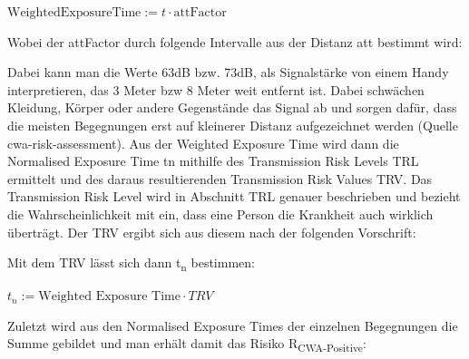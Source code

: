 \documentclass[conference]{IEEEtran}
\begin{document}
\centerline{\text{ }}
\centerline{$\text{WeightedExposureTime} := t \cdot \text{attFactor}$}
\centerline{\text{ }}

Wobei der attFactor durch folgende Intervalle aus der Distanz att bestimmt wird:

\centerline{\text{ }}




\centerline{\text{ }}

Dabei kann man die Werte 63dB bzw. 73dB, als Signalstärke von einem Handy interpretieren, das 3 Meter bzw 8 Meter weit entfernt ist. 
Dabei schwächen Kleidung, Körper oder andere Gegenstände das Signal ab und sorgen dafür, dass die meisten Begegnungen erst auf kleinerer Distanz aufgezeichnet werden (Quelle cwa-risk-assessment).
Aus der Weighted Exposure Time wird dann die Normalised Exposure Time t­n mithilfe des Transmission Risk Levels TRL ermittelt und des daraus resultierenden Transmission Risk Values TRV. 
Das Transmission Risk Level wird in Abschnitt TRL genauer beschrieben und bezieht die Wahrscheinlichkeit mit ein, dass eine Person die Krankheit auch wirklich überträgt. 
Der TRV ergibt sich aus diesem nach der folgenden Vorschrift:

\centerline{\text{ }}








\centerline{\text{ }}

Mit dem TRV lässt sich dann t\textsubscript{n} bestimmen:

\centerline{\text{ }}
\centerline{$t_n := \text{Weighted Exposure Time}\cdot TRV$}
\centerline{\text{ }}

Zuletzt wird aus den Normalised Exposure Times der einzelnen Begegnungen die Summe gebildet und man erhält damit das Risiko R\textsubscript{CWA-Positive}:
\end{document}
